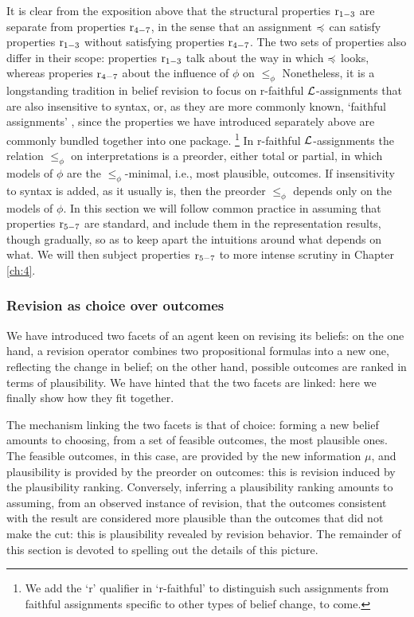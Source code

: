 It is clear from the exposition above that the structural properties $\mathrm{r}_{1-3}$
are separate from properties $\mathrm{r}_{4-7}$, 
in the sense that an assignment $\preccurlyeq$ can satisfy properties $\mathrm{r}_{1-3}$ without 
satisfying properties $\mathrm{r}_{4-7}$.
The two sets of properties also differ in their scope:
properties $\mathrm{r}_{1-3}$ talk about the way in which $\preccurlyeq$ looks,
whereas properies $\mathrm{r}_{4-7}$
about the influence of $\phi$ on $\le_{\phi}$
Nonetheless, it is a longstanding tradition in belief revision to focus 
on r-faithful $\mathcal{L}$-assignments that are also insensitive to syntax,
or, as they are more commonly known, `faithful assignments' \cite{KatsunoM92}, 
since the properties we have introduced separately above 
are commonly bundled together into one package.%
\footnote{
	We add the `r' qualifier in `r-faithful' to distinguish such assignments 
	from faithful assignments specific to other types of belief change, to come.
}
In r-faithful $\mathcal{L}$-assignments the 
relation $\le_{\phi}$ on interpretations is a preorder, either total or partial,
in which models of $\phi$ are 
the $\le_\phi$-minimal, i.e., most plausible, outcomes.
If insensitivity to syntax is added, as it usually is, then the preorder $\le_{\phi}$
depends only on the models of $\phi$.
In this section we will follow common practice in assuming that properties $\mathrm{r}_{5-7}$
are standard, and include them in the representation results,
though gradually, so as to keep apart the intuitions 
around what depends on what.
We will then subject properties $\mathrm{r}_{5-7}$ to more intense scrutiny in Chapter \ref{ch:4}. 

\subsubsection{Revision as choice over outcomes}
We have introduced two facets of an agent keen on revising its beliefs:
on the one hand, a revision operator combines two propositional formulas into a new one, 
reflecting the change in belief; 
on the other hand, possible outcomes are ranked in terms of plausibility. 
We have hinted that the two facets are linked:
here we finally show how they fit together.

The mechanism linking the two facets is that of choice:
forming a new belief amounts to choosing, from a set of feasible outcomes,
the most plausible ones. The feasible outcomes, in this case, are provided
by the new information $\mu$, and plausibility is provided by the preorder on outcomes:
this is revision induced by the plausibility ranking.
Conversely, inferring a plausibility ranking amounts to assuming,
from an observed instance of revision, 
that the outcomes consistent with the result are considered more plausible than the outcomes
that did not make the cut: this is plausibility revealed by revision behavior.
The remainder of this section is devoted to spelling out the details of this picture.

